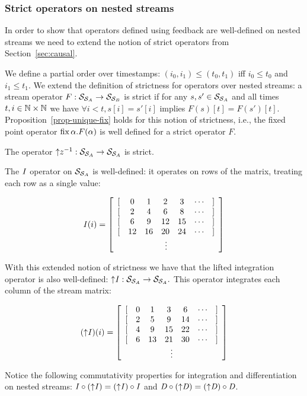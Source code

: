 \subsubsection{Strict operators on nested streams}

In order to show that operators defined using feedback are well-defined on
nested streams we need to extend the notion of strict operators from Section~\ref{sec:causal}.

We define a partial order over timestamps: $(i_0, i_1)
\leq (t_0, t_1)$ iff $i_0 \leq t_0$ and $i_1 \leq t_1$.  We extend the
definition of strictness for operators over nested streams: a stream operator
$F: \mathcal{S}_{\mathcal{S}_{A}} \to \mathcal{S}_{\mathcal{S}_{B}}$ is strict if for any $s, s' \in
\mathcal{S}_{\mathcal{S}_{A}}$ and all times $t, i \in \mathbb{N} \times \mathbb{N}$ we have $\forall i <
t, s[i] = s'[i]$ implies $F(s)[t] = F(s')[t]$.
Proposition~\ref{prop-unique-fix} holds for this notion of strictness, i.e., the fixed point operator $\mbox{fix}\,\alpha.F(\alpha)$ is well defined for a strict operator $F$.

\begin{proposition}\label{prop-liftz}
The operator ${\uparrow}z^{-1}: \mathcal{S}_{\mathcal{S}_{A}} \to \mathcal{S}_{\mathcal{S}_{A}}$ is strict.
\end{proposition}

The $\mathit{I}$ operator on $\mathcal{S}_{\mathcal{S}_{A}}$ is well-defined: it operates on rows
of the matrix, treating each row as a single value:

$$\I(i) = \ssa{0 1 2 3 2 4 6 8 6 9 12 15 12 16 20 24}$$

With this extended notion of strictness we have that the lifted integration operator
is also well-defined: ${\uparrow}\mathit{I}: \mathcal{S}_{\mathcal{S}_{A}} \to \mathcal{S}_{\mathcal{S}_{A}}.$
This operator integrates each column of the stream matrix:

$$(\lift{\I})(i) = \ssa{0 1 3 6 2 5 9 14 4 9 15 22 6 13 21 30}$$

Notice the following commutativity properties for integration and differentiation
on nested streams: $\mathit{I} \circ ({\uparrow}\mathit{I}) = ({\uparrow}\mathit{I}) \circ \mathit{I}$ and
$\mathit{D} \circ ({\uparrow}\mathit{D}) = ({\uparrow}\mathit{D}) \circ \mathit{D}$.

